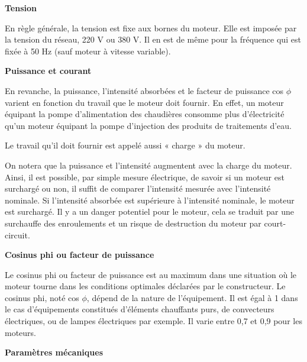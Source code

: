 \textbf{Tension}
\vspace{0.3cm}


En règle générale, la tension est fixe aux bornes du moteur. Elle est imposée par la tension du réseau, 220 V ou 380 V. Il en est de même pour la fréquence qui est fixée à 50 Hz (sauf moteur à vitesse variable).

\vspace{0.3cm}


\textbf{Puissance et courant}
\vspace{0.3cm}

En revanche, la puissance, l’intensité absorbées et le facteur de puissance cos $ \phi $  varient en fonction du travail que le moteur doit fournir. En effet, un moteur équipant la pompe d’alimentation des chaudières consomme plus d’électricité qu’un moteur équipant la pompe d’injection des produits de traitements d’eau.
\vspace{0.3cm}

Le travail qu’il doit fournir est appelé aussi « charge » du moteur.

\vspace{0.3cm}

On notera que la puissance et l’intensité augmentent avec la charge du moteur. Ainsi, il est possible, par simple mesure électrique, de savoir si un moteur est surchargé ou non, il suffit de comparer l’intensité mesurée avec l’intensité nominale. Si l’intensité absorbée est supérieure à l’intensité nominale, le moteur est surchargé. Il y a un danger potentiel pour le moteur, cela se traduit par une surchauffe des enroulements et un risque de destruction du moteur par court-circuit.


\vspace{0.3cm}


\textbf{Cosinus phi ou facteur de puissance}
\vspace{0.3cm} 

Le cosinus phi ou facteur de puissance est au maximum dans une situation où le moteur tourne dans les conditions optimales déclarées par le constructeur.
Le cosinus phi, noté cos $ \phi $, dépend de la nature de l'équipement.
Il est égal à 1 dans le cas d'équipements constitués d'éléments chauffants purs, de convecteurs électriques, ou de lampes électriques par exemple.
Il varie entre 0,7 et 0,9 pour les moteurs.

\vspace{0.3cm}
\textbf{Paramètres mécaniques}
\vspace{0.3cm}


